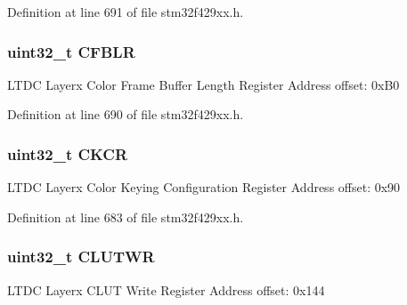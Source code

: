 Definition at line 691 of file stm32f429xx.\+h.

\subsubsection[{\texorpdfstring{C\+F\+B\+LR}{CFBLR}}]{ uint32\+\_\+t C\+F\+B\+LR}\hypertarget{struct_l_t_d_c___layer___type_def_a1c2a59fc9bb4101881c7ddc98b938a4f}{}\label{struct_l_t_d_c___layer___type_def_a1c2a59fc9bb4101881c7ddc98b938a4f}
L\+T\+DC Layerx Color Frame Buffer Length Register Address offset\+: 0x\+B0 

Definition at line 690 of file stm32f429xx.\+h.

\subsubsection[{\texorpdfstring{C\+K\+CR}{CKCR}}]{ uint32\+\_\+t C\+K\+CR}\hypertarget{struct_l_t_d_c___layer___type_def_a7651be3d835a984e908b0abb4a633811}{}\label{struct_l_t_d_c___layer___type_def_a7651be3d835a984e908b0abb4a633811}
L\+T\+DC Layerx Color Keying Configuration Register Address offset\+: 0x90 

Definition at line 683 of file stm32f429xx.\+h.

\subsubsection[{\texorpdfstring{C\+L\+U\+T\+WR}{CLUTWR}}]{ uint32\+\_\+t C\+L\+U\+T\+WR}\hypertarget{struct_l_t_d_c___layer___type_def_a5ab25158531531e9b1cdb2bdbe66b67d}{}\label{struct_l_t_d_c___layer___type_def_a5ab25158531531e9b1cdb2bdbe66b67d}
L\+T\+DC Layerx C\+L\+UT Write Register Address offset\+: 0x144 


